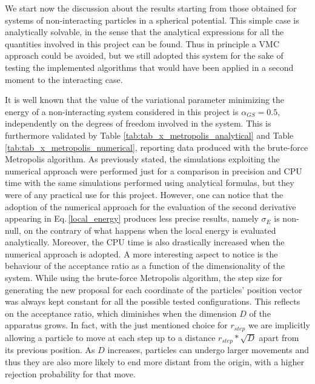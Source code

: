 We start now the discussion about the results starting from those obtained for systems of non-interacting particles in a spherical potential. This simple case is analytically solvable, in the sense that the analytical expressions for all the quantities involved in this project can be found. Thus in principle a VMC approach could be avoided, but we still adopted this system for the sake of testing the implemented algorithms that would have been applied in a second moment to the interacting case. 

It is well known that the value of the variational parameter minimizing the energy of a non-interacting system considered in this project is $\alpha_{GS}=0.5$, independently on the degrees of freedom involved in the system. This is furthermore validated by Table \ref{tab:tab_x_metropolis_analytical} and Table \ref{tab:tab_x_metropolis_numerical}, reporting data produced with the brute-force Metropolis algorithm. As previously stated, the simulations exploiting the numerical approach were performed just for a comparison in precision and CPU time with the same simulations performed using analytical formulas, but they were of any practical use for this project. However, one can notice that the adoption of the numerical approach for the evaluation of the second derivative appearing in Eq.\,\ref{local_energy} produces less precise results, namely $\sigma_E$ is non-null, on the contrary of what happens when the local energy is evaluated analytically. Moreover, the CPU time is also drastically increased when the numerical approach is adopted. A more interesting aspect to notice is the behaviour of the acceptance ratio as a function of the dimensionality of the system. While using the brute-force Metropolis algorithm, the step size for generating the new proposal for each coordinate of the particles' position vector was always kept constant for all the possible tested configurations. This reflects on the acceptance ratio, which diminishes when the dimension $D$ of the apparatus grows. In fact, with the just mentioned choice for $r_{step}$ we are implicitly allowing a particle to move at each step up to a distance $r_{step} \ast \sqrt{D}$ apart from its previous position. As $D$ increases, particles can undergo larger movements and thus they are also more likely to end more distant from the origin, with a higher rejection probability for that move. \\

